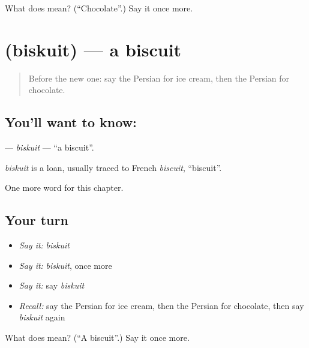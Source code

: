 \begin{tcolorbox}[breakable,colback=teal!4,colframe=teal!35!black,title={Before you move on}]
What does  mean? (\textquotedblleft{}Chocolate\textquotedblright{}.) Say it once more.
\end{tcolorbox}
\section[\texorpdfstring{\fa{بیسکویت} (biskuit)}{بیسکویت (biskuit)}]{ (biskuit) — a biscuit}

\label{lesson:FA-C167-biskuit}



\begin{quote}
Before the new one: say the Persian for ice cream, then the Persian for chocolate.
\end{quote}

\subsection*{You'll want to know: }
\textbf{} — \emph{biskuit} — \textquotedblleft{}a biscuit\textquotedblright{}.

\begin{cousinweb}
\emph{biskuit} is a loan, usually traced to French \emph{biscuit}, \textquotedblleft{}biscuit\textquotedblright{}.
\end{cousinweb}

\begin{grammarlens}[title={What you've built}]
One more word for this chapter.
\end{grammarlens}

\subsection*{Your turn}
\begin{itemize}
\raggedright
  \item \emph{Say it:} \emph{biskuit}
  \item \emph{Say it:} \emph{biskuit}, once more
  \item \emph{Say it:} say \emph{biskuit}
  \item \emph{Recall:} say the Persian for ice cream, then the Persian for chocolate, then say \emph{biskuit} again
\end{itemize}

\begin{tcolorbox}[breakable,colback=teal!4,colframe=teal!35!black,title={Before you move on}]
What does  mean? (\textquotedblleft{}A biscuit\textquotedblright{}.) Say it once more.
\end{tcolorbox}
